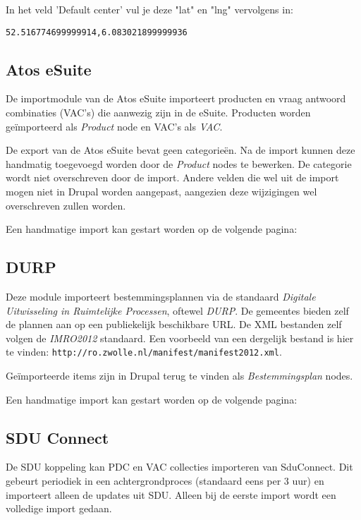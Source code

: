 In het veld 'Default center' vul je deze "lat" en "lng" vervolgens in:
\begin{verbatim}
52.516774699999914,6.083021899999936
\end{verbatim}

\subsection{Atos eSuite}

De importmodule van de Atos eSuite importeert producten en vraag antwoord combinaties (VAC's) die aanwezig zijn in de eSuite. Producten worden ge\"{i}mporteerd als \emph{Product} node en VAC's als \emph{VAC}.

De export van de Atos eSuite bevat geen categorie\"{e}n. Na de import kunnen deze handmatig toegevoegd worden door de \emph{Product} nodes te bewerken. De categorie wordt niet overschreven door de import. Andere velden die wel uit de import mogen niet in Drupal worden aangepast, aangezien deze wijzigingen wel overschreven zullen worden.

Een handmatige import kan gestart worden op de volgende pagina: \\

\subsection{DURP}

Deze module importeert bestemmingsplannen via de standaard \emph{Digitale Uitwisseling in Ruimtelijke Processen}, oftewel \emph{DURP}. De gemeentes bieden zelf de plannen aan op een publiekelijk beschikbare URL. De XML bestanden zelf volgen de \emph{IMRO2012} standaard. Een voorbeeld van een dergelijk bestand is hier te vinden:
\texttt{http://ro.zwolle.nl/manifest/manifest2012.xml}.

Ge\"{i}mporteerde items zijn in Drupal terug te vinden als \emph{Bestemmingsplan} nodes.

Een handmatige import kan gestart worden op de volgende pagina: \\


\subsection{SDU Connect}

De SDU koppeling kan PDC en VAC collecties importeren van SduConnect. Dit gebeurt periodiek in een achtergrondproces (standaard eens per 3 uur) en importeert alleen de updates uit SDU. Alleen bij de eerste import wordt een volledige import gedaan.

